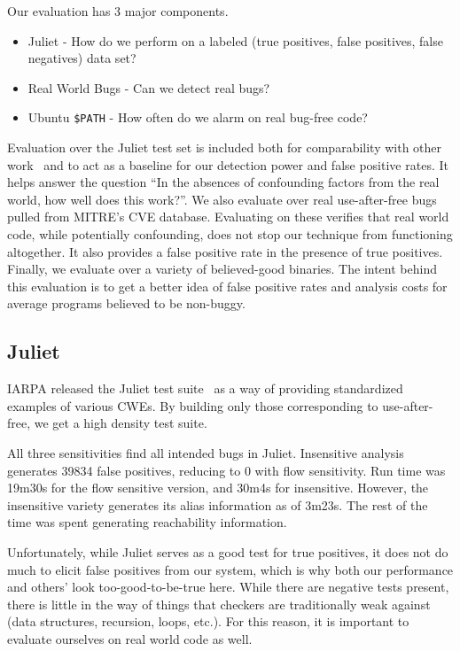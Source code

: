 \label{alias:sec:eval}
Our evaluation has 3 major components.
\begin{itemize}
\item Juliet - How do we perform on a labeled (true positives, false positives, false negatives) data set?
\item Real World Bugs - Can we detect real bugs? 
\item Ubuntu \texttt{\$PATH} - How often do we alarm on real bug-free code?
\end{itemize}

Evaluation over the Juliet test set is included both for comparability with other work~\cite{tac, juliet-eval-static-source} and to act as a baseline for our detection power and false positive rates.
It helps answer the question ``In the absences of confounding factors from the real world, how well does this work?''.
We also evaluate over real use-after-free bugs pulled from MITRE's CVE database.
Evaluating on these verifies that real world code, while potentially confounding, does not stop our technique from functioning altogether.
It also provides a false positive rate in the presence of true positives.
Finally, we evaluate over a variety of believed-good binaries.
The intent behind this evaluation is to get a better idea of false positive rates and analysis costs for average programs believed to be non-buggy.

\subsection{Juliet}
IARPA released the Juliet test suite~\cite{juliet} as a way of providing standardized examples of various CWEs.
By building only those corresponding to use-after-free, we get a high density test suite.

All three sensitivities find all intended bugs in Juliet.
Insensitive analysis generates 39834 false positives, reducing to 0 with flow sensitivity.
Run time was 19m30s for the flow sensitive version, and 30m4s for insensitive.
However, the insensitive variety generates its alias information as of 3m23s.
The rest of the time was spent generating reachability information.

Unfortunately, while Juliet serves as a good test for true positives, it does not do much to elicit false positives from our system, which is why both our performance and others' look too-good-to-be-true here.
While there are negative tests present, there is little in the way of things that checkers are traditionally weak against (data structures, recursion, loops, etc.).
For this reason, it is important to evaluate ourselves on real world code as well.

